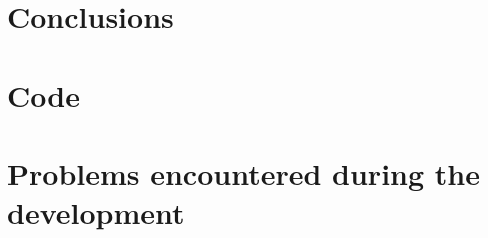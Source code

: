 \documentclass[11pt]{report}
\begin{document}
\chapter{Conclusions}

%




\appendix 

\chapter{Code}
\label{chap:code}

\chapter{Problems encountered during the development}
\end{document}
